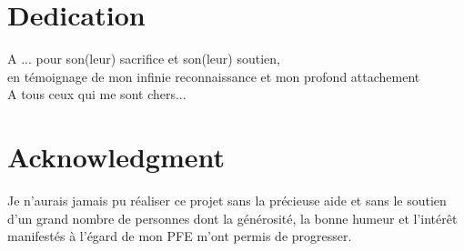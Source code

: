 \documentclass[a4paper, oneside, 12pt, final]{extreport}
\newcommand{\reportAuthor} {%
  Nom \textsc{Prénom}%
}
\begin{document}
\chapter*{Dedication}
\thispagestyle{empty}
%

\begin{center}
{\it 
	
A ... pour son(leur) sacrifice et son(leur) soutien, \\
en témoignage de mon infinie reconnaissance et mon profond attachement \\
\vspace{1cm}
A tous ceux qui me sont chers...

}
\end{center}
%
%

\chapter*{Acknowledgment}
\thispagestyle{empty}
%

Je n'aurais jamais pu réaliser ce projet sans la précieuse aide et sans le soutien d'un grand nombre de personnes dont la générosité, la bonne humeur et l'intérêt manifestés à l'égard de mon PFE m'ont permis de progresser. \\

\end{document}
